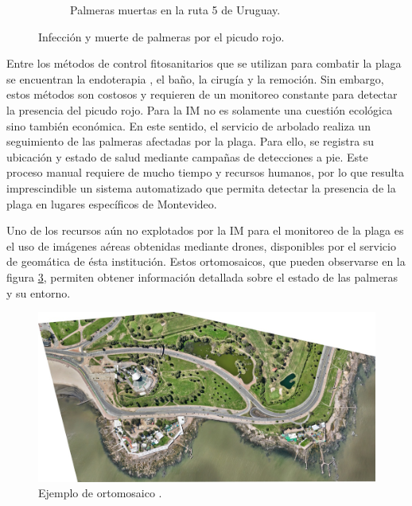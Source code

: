 \begin{figure}[htpb]
\begin{subfigure}[b]{0.49\textwidth}
    \caption{Palmeras muertas en la ruta 5 de Uruguay.}
    \label{fig:palmeras-ruta5}
  \end{subfigure}
  \caption{Infección y muerte de palmeras por el picudo rojo.}
  \label{fig:infeccion-y-muerte-palmeras}
\end{figure}

Entre los métodos de control fitosanitarios que se utilizan para combatir la plaga se encuentran la endoterapia \citep{intendencia_de_montevideo_acciones_nodate}, el baño, la cirugía \citep{sanchez_cirugiespecializada_nodate} y la remoción. Sin embargo, estos métodos son costosos y requieren de un monitoreo constante para detectar la presencia del picudo rojo. Para la IM no es solamente una cuestión ecológica sino también económica. En este sentido, el servicio de arbolado realiza un seguimiento de las palmeras afectadas por la plaga. Para ello, se registra su ubicación y estado de salud mediante campañas de detecciones a pie. Este proceso manual requiere de mucho tiempo y recursos humanos, por lo que resulta imprescindible un sistema automatizado que permita detectar la presencia de la plaga en lugares específicos de Montevideo.

Uno de los recursos aún no explotados por la IM para el monitoreo de la plaga es el uso de imágenes aéreas obtenidas mediante drones, disponibles por el servicio de geomática de ésta institución. Estos ortomosaicos, que pueden observarse en la figura \ref{fig:ejemplo-ortomosaico}, permiten obtener información detallada sobre el estado de las palmeras y su entorno.

\begin{figure}[H]
  \centering
  \includegraphics[scale=0.5]{./Figures/ejemplo-ortomosaico.jpg}
  \caption{Ejemplo de ortomosaico \protect\footnotemark.}
  \label{fig:ejemplo-ortomosaico}
\end{figure}


